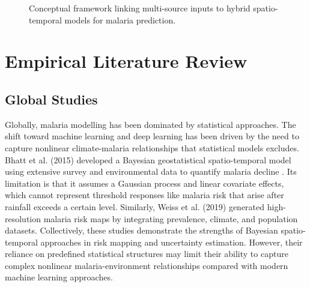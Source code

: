 \begin{figure}[H]
{
	}
	\caption{Conceptual framework linking multi-source inputs to hybrid spatio-temporal models for malaria prediction.}
	\label{fig:conceptual_framework}
\end{figure}
\FloatBarrier
	\vspace{-0.3cm}
\section{Empirical Literature Review}

\subsection{Global Studies}

Globally, malaria modelling has been dominated by statistical approaches. The shift toward machine learning and deep learning has been driven by the need to capture nonlinear climate-malaria relationships that statistical models excludes. Bhatt et al. (2015) \cite{Bhatt2015} developed a Bayesian geostatistical spatio-temporal model using extensive survey and environmental data to quantify malaria decline . Its limitation is that it assumes a Gaussian process and linear covariate effects, which cannot represent threshold responses like malaria risk that  arise after rainfall exceeds a certain level. Similarly, Weiss et al. (2019) \cite{Weiss2019Mapping} generated high-resolution malaria risk maps by integrating prevalence, climate, and population datasets.  Collectively, these studies demonstrate the strengths of Bayesian spatio-temporal approaches in risk mapping and uncertainty estimation. However, their reliance on predefined statistical structures may limit their ability to capture complex nonlinear malaria-environment relationships compared with modern machine learning approaches.
